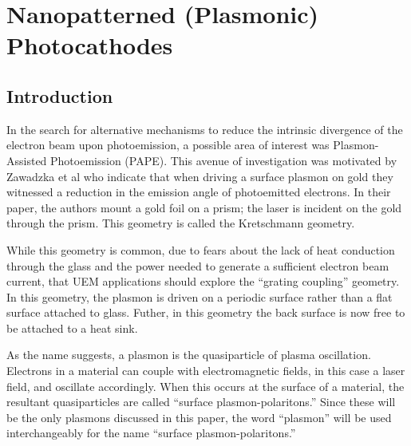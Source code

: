 
\section{Nanopatterned (Plasmonic) Photocathodes}

\subsection{Introduction}

In the search for alternative mechanisms to reduce the intrinsic divergence of the electron beam upon photoemission, a possible area of interest was Plasmon-Assisted Photoemission (PAPE). 
This avenue of investigation was motivated by Zawadzka et al \cite{zawadzka_evanescent_2001} who indicate that when driving a surface plasmon on gold they witnessed a reduction in the emission angle of photoemitted electrons.
In their paper, the authors mount a gold foil on a prism; the laser is incident on the gold through the prism.
This geometry is called the Kretschmann geometry.

While this geometry is common, due to fears about the lack of heat conduction through the glass and the power needed to generate a sufficient electron beam current, that UEM applications should explore the ``grating coupling'' geometry.
In this geometry, the plasmon is driven on a periodic surface rather than a flat surface attached to glass.
Futher, in this geometry the back surface is now free to be attached to a heat sink.


As the name suggests, a plasmon is the quasiparticle of plasma oscillation.
Electrons in a material can couple with electromagnetic fields, in this case a laser field, and oscillate accordingly.
When this occurs at the surface of a material, the resultant quasiparticles are called ``surface plasmon-polaritons.''
Since these will be the only plasmons discussed in this paper, the word ``plasmon'' will be used interchangeably for the name ``surface plasmon-polaritons.''

